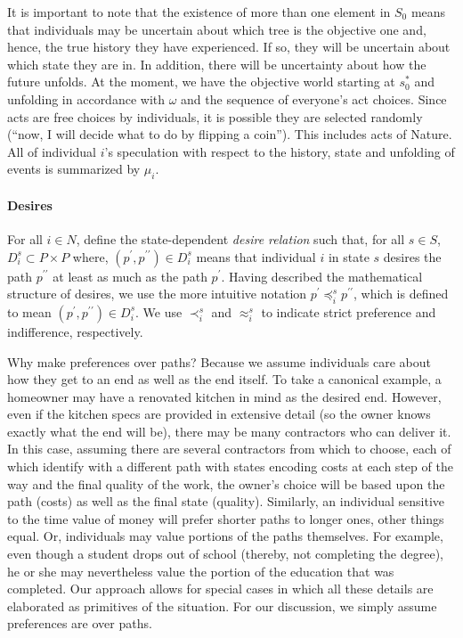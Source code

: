 \documentclass[
11pt,
titlepage,
reqno,
]{article}%
\theoremstyle{definition}
\begin{document}
	It is important to note that the existence of more than one element in $S_0$ means that individuals may be uncertain about which tree is the objective one and, hence, the true history they have experienced. 
	If so, they will be uncertain about which state they are in. 
	In addition, there will be uncertainty about how the future unfolds. 
	At the moment, we have the objective world starting at $s_0^\ast$ and unfolding in accordance with $\omega$ and the sequence of everyone's act choices. 
	Since  acts are free choices by individuals, it is possible they are selected randomly (``now, I will decide what to do by flipping a coin'').
	This includes acts of Nature.
	All of individual $i$'s speculation with respect to the history, state and unfolding of events is summarized by $\mu_i$.
	
	\paragraph*{Desires \label{para: desires}}
	For all $i\in N$, define the state-dependent \textit{desire relation} such that, for all $s\in S$,   $D_i^s\subset P\times P$ where, $(p^\prime,p^{\prime\prime})\in D_i^s$ means that  individual $i$ in state $s$ desires the path $p^{\prime\prime}$ at least as much as the path $p^\prime$. 
	Having described the mathematical structure of desires, we use the more intuitive notation $p^\prime\preceq_i^s p^{\prime\prime}$, which is defined to mean $(p^\prime,p^{\prime\prime})\in D_i^s$. 
	We use $\prec_i^s$ and $\approx_i^s$ to indicate strict preference and indifference, respectively. 
	
	Why make preferences over paths? Because we assume individuals care about how they get to an end as well as the end itself. 
	To take a canonical example, a homeowner may have a renovated kitchen in mind as the desired end. 
	However, even if the kitchen specs are provided in extensive detail (so the owner knows exactly what the end will be), there may be many contractors who can deliver it. 
	In this case, assuming there are several contractors from which to choose, each of which identify with a different path with states encoding costs  at each step of the way and the final quality of the work, the owner's choice will be based upon the path (costs) as well as the final state (quality). 
	Similarly, an individual sensitive to the time value of money will prefer shorter paths to longer ones, other things equal. 
	Or, individuals may value portions of the paths themselves.
	For example, even though a student drops out of school (thereby, not completing the degree), he or she may nevertheless value the portion of the education that was completed. 
	Our approach allows for special cases in which all these details are elaborated as primitives of the situation. For our discussion, we simply assume preferences are over paths.    %
	
\end{document}
